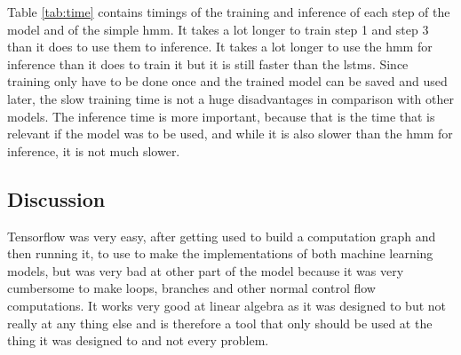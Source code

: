 Table \ref{tab:time} contains timings of the training and inference of each 
step of the model and of the simple \gls{hmm}. It takes a lot longer to train 
step 1 and step 3 than it does to use them to inference. 
It takes a lot longer to use the \gls{hmm} for inference than it does to train
it but it is still faster than the \glspl{lstm}. Since training only have to be
done once and the trained model can be saved and used later, the slow training 
time is not a huge disadvantages in comparison with other models. The inference
time is more important, because that is the time that is relevant if the model 
was to be used, and while it is also slower than the \gls{hmm} for inference,
it is not much slower.

\subsection{Discussion}
Tensorflow was very easy, after getting used to build a computation graph and 
then running it, to use to make the implementations of both machine learning models,
but was very bad at other part of the model because it was very cumbersome 
to make loops, branches and other normal control flow computations.
It works very good at linear algebra as it was designed to but not 
really at any thing else and is therefore a tool that only should be used
at the thing it was designed to and not every problem.

